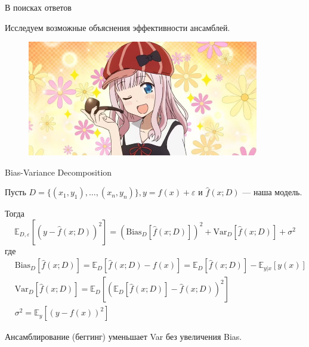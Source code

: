 \documentclass[9pt]{beamer}
\begin{document}
\begin{frame}{В поисках ответов}
    \begin{block}{}
        Исследуем возможные объяснения эффективности ансамблей.
    \end{block}

    \begin{figure}
        \centering
        \includegraphics[width=0.9\textwidth]{images/image4.png}
    \end{figure}
\end{frame}

\begin{frame}{Bias-Variance Decomposition}
    \begin{block}{Пусть}
        $D = \{ (x_1, y_1), \ldots, (x_n, y_n) \}, y = f(x) + \varepsilon$ и $\hat{f}(x; D)$ --- наша модель.
    \end{block}

    \begin{block}{Тогда}
        \begin{equation*}
            \mathbb{E}_{D, \varepsilon} \left[ (y - \hat{f}(x; D))^2 \right] = \left( \text{Bias}_D \left[ \hat{f}(x; D) \right] \right)^2 + \text{Var}_D \left[ \hat{f}(x; D) \right] + \sigma^2
        \end{equation*}
        где
        \begin{align*}
            &\text{Bias}_D \left[ \hat{f}(x; D) \right] = \mathbb{E}_D \left[ \hat{f}(x; D) - f(x) \right] = \mathbb{E}_D \left[ \hat{f}(x; D) \right] - \mathbb{E}_{y | x} \left[ y(x) \right] \\
            &\text{Var}_D \left[ \hat{f}(x; D) \right] = \mathbb{E}_D \left[ \left( \mathbb{E}_D \left[ \hat{f}(x; D) \right] - \hat{f}(x; D) \right)^2 \right] \\
            &\sigma^2 = \mathbb{E}_y \left[ (y - f(x))^2 \right]
        \end{align*}
    \end{block}

    \begin{block}{}
        Ансамблирование (беггинг) уменьшает Var без увеличения Bias.
    \end{block}
\end{frame}
\end{document}
